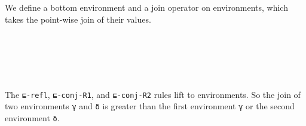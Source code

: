 We define a bottom environment and a join operator on environments,
which takes the point-wise join of their values.

\begin{fence}
\begin{code}%
\>[0]\AgdaSpace{}%
\AgdaSymbol{:}\AgdaSpace{}%
\AgdaSpace{}%
\AgdaSymbol{\{}\AgdaSymbol{\}}\AgdaSpace{}%
\AgdaSpace{}%
\AgdaSpace{}%
\<%
\\
\>[0]\AgdaSpace{}%
\AgdaSpace{}%
\AgdaSymbol{=}\AgdaSpace{}%
\<%
\\
%
\\[\AgdaEmptyExtraSkip]%
\>[0]\AgdaSpace{}%
\AgdaSymbol{:}\AgdaSpace{}%
\AgdaSpace{}%
\AgdaSymbol{\{}\AgdaSymbol{\}}\AgdaSpace{}%
\AgdaSpace{}%
\AgdaSpace{}%
\AgdaSpace{}%
\AgdaSpace{}%
\AgdaSpace{}%
\AgdaSpace{}%
\AgdaSpace{}%
\AgdaSpace{}%
\<%
\\
\>[0]\AgdaSymbol{(}\AgdaSpace{}%
\AgdaSpace{}%
\AgdaSymbol{)}\AgdaSpace{}%
\AgdaSpace{}%
\AgdaSymbol{=}\AgdaSpace{}%
\AgdaSpace{}%
\AgdaSpace{}%
\AgdaSpace{}%
\AgdaSpace{}%
\<%
\end{code}
\end{fence}

The \texttt{⊑-refl}, \texttt{⊑-conj-R1}, and \texttt{⊑-conj-R2} rules
lift to environments. So the join of two environments \texttt{γ} and
\texttt{δ} is greater than the first environment \texttt{γ} or the
second environment \texttt{δ}.

